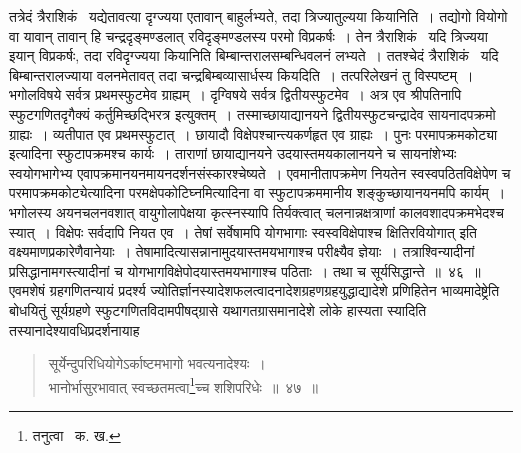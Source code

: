 \documentclass[11pt, openany]{book}
\begin{document}
\noindent तत्रेदं त्रैराशिकं \textendash\ यद्येतावत्या दृग्ज्यया एतावान् बाहुर्लभ्यते, तदा त्रिज्यातुल्यया कियानिति~। तद्योगो वियोगो वा यावान् तावान् हि चन्द्रदृङ्मण्डलात् रविदृङ्मण्डलस्य परमो विप्रकर्षः~। तेन त्रैराशिकं \textendash\ यदि त्रिज्यया इयान् विप्रकर्षः, तदा रविदृग्ज्यया कियानिति बिम्बान्तरालसम्बन्धिवलनं लभ्यते~। ततश्चेदं त्रैराशिकं \textendash\ यदि बिम्बान्तरालज्याया वलनमेतावत् तदा चन्द्रबिम्बव्यासार्धस्य कियदिति~। तत्परिलेखनं तु विस्पष्टम्~। भगोलविषये सर्वत्र प्रथमस्फुटमेव ग्राह्यम्~। दृग्विषये सर्वत्र द्वितीयस्फुटमेव~। अत्र एव श्रीपतिनापि {\qt स्फुटगणितदृगैक्यं कर्तुमिच्छद्भिरत्र} इत्युक्तम्~। तस्माच्छायाद्यानयने द्वितीयस्फुटचन्द्रादेव सायनादपक्रमो ग्राह्यः~। व्यतीपात एव प्रथमस्फुटात्~। छायादौ विक्षेपश्चान्त्यकर्णहृत एव ग्राह्यः~। पुनः {\qt परमापक्रमकोट्या} इत्यादिना स्फुटापक्रमश्च कार्यः~। ताराणां छायाद्यानयने उदयास्तमयकालानयने च सायनांशेभ्यः स्वयोगभागेभ्य एवापक्रमानयनमायनदर्शनसंस्कारश्चेष्यते~। एवमानीतापक्रमेण नियतेन स्वस्वपठितविक्षेपेण च {\qt परमापक्रमकोट्ये}त्यादिना {\qt परमक्षेपकोटिघ्न}मित्यादिना वा स्फुटापक्रममानीय शङ्कुच्छायानयनमपि कार्यम्~। भगोलस्य अयनचलनवशात् वायुगोलापेक्षया कृत्स्नस्यापि तिर्यक्त्वात् चलनान्नक्षत्राणां कालवशादपक्रमभेदश्च स्यात्~। विक्षेपः सर्वदापि नियत
एव~। तेषां सर्वेषामपि योगभागाः स्वस्वविक्षेपाश्च {\qt क्षितिरवियोगात्} इति वक्ष्यमाणप्रकारेणैवानेयाः~। तेषामादित्यासन्नानामुदयास्तमयभागाश्च
परीक्ष्यैव ज्ञेयाः~। तत्राश्विन्यादीनां प्रसिद्धानामगस्त्यादीनां च योगभागविक्षेपोदयास्तमयभागाश्च पठिताः~। तथा च सूर्यसिद्धान्ते~॥~४६~॥\\


\indent एवमशेषं ग्रहगणितन्यायं प्रदर्श्य ज्योतिर्ज्ञानस्यादेशफलत्वादनादेशग्रहणग्रहयुद्धाद्यादेशे प्रणिहितेन भाव्यमादेष्ट्रेति बोधयितुं सूर्यग्रहणे
स्फुटगणितविदामपीषद्ग्रासे यथागतग्रासमानादेशे लोके हास्यता स्यादिति तस्यानादेश्यावधिप्रदर्शनायाह\textendash 

\newpage

\begin{quote}
{\ab सूर्येन्दुपरिधियोगेऽर्काष्टमभागो भवत्यनादेश्यः~।\\
भानोर्भासुरभावात् स्वच्छतमत्वा\renewcommand{\thefootnote}{१}\footnote{तनुत्वा \textendash\ क. ख.}च्च शशिपरिधेः~॥~४७~॥} 
\end{quote}
\end{document}
